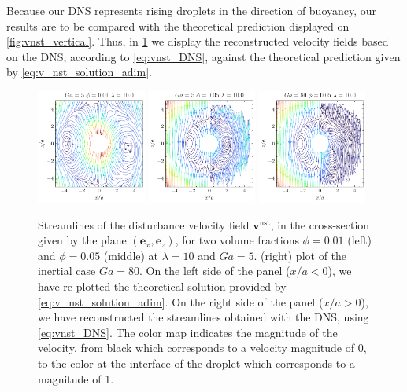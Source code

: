 Because our DNS represents rising droplets in the direction of buoyancy, our results are to be compared with the theoretical prediction displayed on \ref{fig:vnst_vertical}. 
Thus, in \ref{fig:vnst_DNS} we display the reconstructed velocity fields based on the DNS, according to \ref{eq:vnst_DNS}, against the theoretical prediction given by \ref{eq:v_nst_solution_adim}. 
\begin{figure}
    \centering
    \includegraphics[width = 0.32\textwidth]{image/HOMOGENEOUS_final/Stream/Stream_PHI_1_Ga_5_l_10.pdf}
    \includegraphics[width = 0.32\textwidth]{image/HOMOGENEOUS_final/Stream/Stream_PHI_5_Ga_5_l_10.pdf}
    \includegraphics[width = 0.32\textwidth]{image/HOMOGENEOUS_final/Stream/Stream_PHI_5_Ga_80_l_10.pdf}
    \caption{Streamlines of the disturbance velocity field $\textbf{v}^\text{nst}$, in the cross-section given by the plane $(\textbf{e}_x,\textbf{e}_z)$, for two volume fractions $\phi = 0.01$ (left) and $\phi = 0.05$ (middle) at $\lambda = 10$ and $Ga = 5$.
    (right) plot of the inertial case $Ga = 80$. 
    On the left side of the panel ($x/a < 0$), we have re-plotted the theoretical solution provided by \ref{eq:v_nst_solution_adim}.   
    On the right side of the panel ($x/a > 0$), we have reconstructed the streamlines obtained with the DNS, using \ref{eq:vnst_DNS}. 
    The color map indicates the magnitude of the velocity, from black which corresponds to a velocity magnitude of 0, to the color at the interface of the droplet which corresponds to a magnitude of 1.}
    \label{fig:vnst_DNS}
\end{figure}
